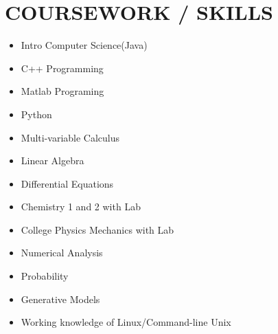 \documentclass[letterpaper,11pt]{article}
\begin{document}
\section{COURSEWORK / SKILLS}
        \begin{multicols}{4}
            \begin{itemize}[itemsep=-2pt, parsep=5pt]
               \item Intro Computer Science(Java)
                \item C++ Programming
                \item Matlab Programing 
                \item Python 
                \item Multi-variable Calculus
                \item Linear Algebra 
                \item Differential Equations
                \item Chemistry 1 and 2 with Lab 
                \item College Physics Mechanics with Lab 
                \item Numerical Analysis
                \item Probability  
                \item Generative Models 
                \item Working knowledge of Linux/Command-line Unix
            \end{itemize}
        \end{multicols}
        \vspace*{2.0\multicolsep}
\end{document}
